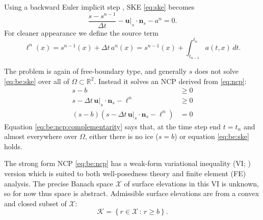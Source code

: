 \documentclass[hidelinks,onefignum,onetabnum,final]{siamart220329}  %
\newcommand{\RR}{\mathbb{R}}
\newcommand{\bn}{\mathbf{n}}
\newcommand{\bu}{\mathbf{u}}
\newcommand{\cK}{\mathcal{K}}
\newcommand{\cX}{\mathcal{X}}
\begin{document}
Using a backward Euler implicit step \cite{AscherPetzold1998}, SKE \eqref{eq:ske} becomes
\begin{equation}
\frac{s - s^{n-1}}{\Delta t} - \bu|_{s} \cdot \bn_{s} - a^n = 0. \label{eq:be:ske}
\end{equation}
For cleaner appearance we define the source term
\begin{equation}
\ell^n(x) = s^{n-1}(x)+\Delta t\,a^n(x) = s^{n-1}(x) + \int_{t_{n-1}}^{t_n} a(t,x)\,dt. \label{eq:be:source}
\end{equation}

The problem is again of free-boundary type, and generally $s$ does not solve \eqref{eq:be:ske} over all of $\Omega\subset \RR^2$.  Instead it solves an NCP derived from \eqref{eq:ncp}:
\begin{subequations}
\label{eq:be:ncp}
\begin{align}
s - b &\ge 0 \label{eq:be:ncp:constraint} \\
s - \Delta t\,\bu|_s \cdot \bn_s - \ell^n &\ge 0 \\
(s - b) \left(s - \Delta t\,\bu|_s \cdot \bn_s - \ell^n\right) &= 0 \label{eq:be:ncp:complementarity}
\end{align}
\end{subequations}
Equation \eqref{eq:be:ncp:complementarity} says that, at the time step end $t=t_n$ and almost everywhere over $\Omega$, either there is no ice ($s=b$) or equation \eqref{eq:be:ske} holds.

The strong form NCP \eqref{eq:be:ncp} has a weak-form variational inequality (VI; \cite{Evans2010,KinderlehrerStampacchia1980}) version which is suited to both well-posedness theory and finite element (FE) analysis.  The precise Banach space $\cX$ of surface elevations in this VI is unknown, so for now thus space is abstract.  Admissible surface elevations are from a convex and closed subset of $\cX$:
\begin{equation}
\cK = \left\{r \in\cX\,:\,r \ge b\right\}.  \label{eq:be:admissible}
\end{equation}
\end{document}
